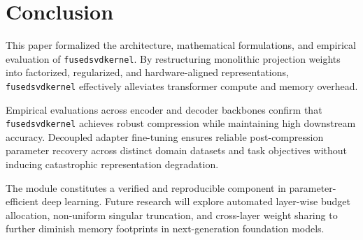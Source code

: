 \section{Conclusion}
This paper formalized the architecture, mathematical formulations, and empirical evaluation of \texttt{fusedsvdkernel}. By restructuring monolithic projection weights into factorized, regularized, and hardware-aligned representations, \texttt{fusedsvdkernel} effectively alleviates transformer compute and memory overhead.

Empirical evaluations across encoder and decoder backbones confirm that \texttt{fusedsvdkernel} achieves robust compression while maintaining high downstream accuracy. Decoupled adapter fine-tuning ensures reliable post-compression parameter recovery across distinct domain datasets and task objectives without inducing catastrophic representation degradation.

The module constitutes a verified and reproducible component in parameter-efficient deep learning. Future research will explore automated layer-wise budget allocation, non-uniform singular truncation, and cross-layer weight sharing to further diminish memory footprints in next-generation foundation models.
